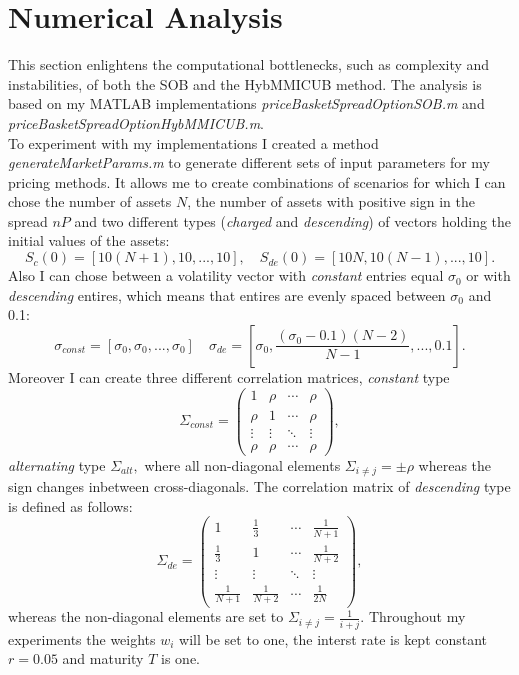 \documentclass[a4paper]{article}
\begin{document}
\newpage
\section{Numerical Analysis}
\label{sec:na}
This section enlightens the computational bottlenecks, such as complexity and instabilities, of both the SOB and the HybMMICUB method. The analysis is based on my MATLAB implementations \emph{priceBasketSpreadOptionSOB.m} and \emph{priceBasketSpreadOptionHybMMICUB.m}.\\
To experiment with my implementations I created a method \emph{generateMarketParams.m} to generate different sets of input parameters for my pricing methods. It allows me to create combinations of scenarios for which I can chose the number of assets $N$, the number of assets with positive sign in the spread $nP$ and two different types (\emph{charged} and \emph{descending}) of vectors holding the initial values of the assets: 
$$S_{c}(0) = [10(N+1), 10, ..., 10],\quad S_{de}(0) = [10N, 10(N-1), ..., 10].$$ 
Also I can chose between a volatility vector with \emph{constant} entries equal $\sigma_0$ or with \emph{descending} entires, which means that entires are evenly spaced between $\sigma_0$ and 0.1: 
$$\sigma_{const} = [\sigma_0, \sigma_0, ...,\sigma_0] \quad \sigma_{de} = [\sigma_0,\frac{(\sigma_0-0.1)(N-2)}{N-1}, ..., 0.1].$$
Moreover I can create three different correlation matrices, \emph{constant} type
$$\Sigma_{const} =\begin{pmatrix}1 & \rho & \cdots & \rho \\ \rho & 1 & \cdots & \rho \\ \vdots & \vdots & \ddots & \vdots \\ \rho & \rho & \cdots & \rho \end{pmatrix}  ,$$
\emph{alternating} type $\Sigma_{alt},$ where all non-diagonal elements $\Sigma_{i\neq j} = \pm \rho$ whereas the sign changes inbetween cross-diagonals. The correlation matrix of \emph{descending} type is defined as follows:
$$\Sigma_{de} = \begin{pmatrix}1 & \frac{1}{3} & \cdots & \frac{1}{N+1} \\ \frac{1}{3} & 1 & \cdots & \frac{1}{N+2} \\ \vdots & \vdots & \ddots & \vdots \\ \frac{1}{N+1} & \frac{1}{N+2} & \cdots & \frac{1}{2N} \end{pmatrix},$$
whereas the non-diagonal elements are set to $\Sigma_{i\neq j} = \frac{1}{i+j}$.
Throughout my experiments the weights $w_i$ will be set to one, the interst rate is kept constant $r=0.05$ and maturity $T$ is one.
\end{document}
